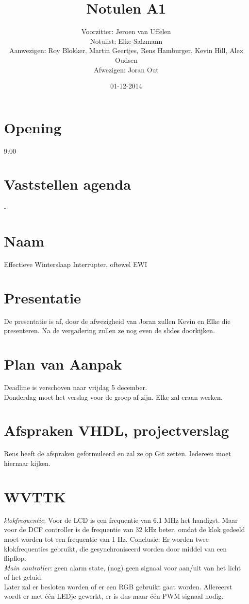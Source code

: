 \documentclass[11pt,twoside,a4paper]{article}
\title{Notulen A1}
\author{
Voorzitter: Jeroen van Uffelen\\
Notulist: Elke Salzmann\\
Aanwezigen: Roy Blokker, Martin Geertjes, Rens Hamburger, Kevin Hill, Alex Oudsen\\
Afwezigen: Joran Out\\
}
\date{01-12-2014}
\begin{document}
\maketitle

\section{Opening}
9:00
\section{Vaststellen agenda}
-
\section{Naam}
Effectieve Winterslaap Interrupter, oftewel EWI

\section{Presentatie}
De presentatie is af, door de afwezigheid van Joran zullen Kevin en Elke die presenteren. Na de vergadering zullen ze nog even de slides doorkijken.

\section{Plan van Aanpak}
Deadline is verschoven naar vrijdag 5 december.\\
Donderdag moet het verslag voor de groep af zijn.
Elke zal eraan werken.

\section{Afspraken VHDL, projectverslag}
Rens heeft de afspraken geformuleerd en zal ze op Git zetten. Iedereen moet hiernaar kijken.

\section{WVTTK}
\emph{klokfrequentie}: Voor de LCD is een frequentie van 6.1 MHz het handigst. Maar voor de DCF controller is de frequentie van 32 kHz beter, omdat de klok gedeeld moet worden tot een frequentie van 1 Hz.
Conclusie: Er worden twee klokfrequenties gebruikt, die gesynchroniseerd worden door middel van een flipflop.\\
\emph{Main controller}: geen alarm state, (nog) geen signaal voor aan/uit van het licht of het geluid.\\
Later zal er besloten worden of er een RGB gebruikt gaat worden. Allereerst wordt er met \'e\'en LEDje gewerkt, er is dus maar \'e\'en PWM signaal nodig.
\end{document}
